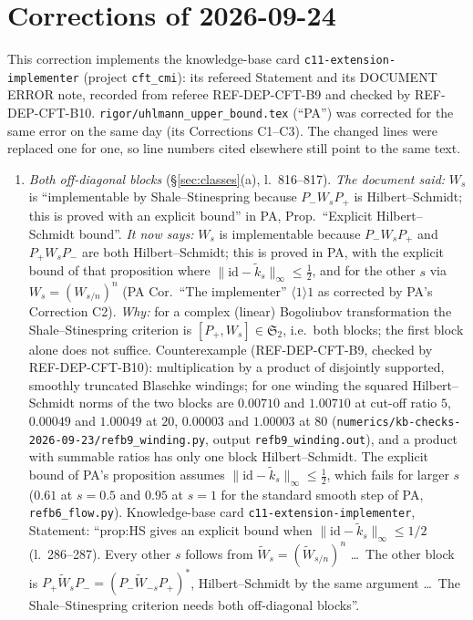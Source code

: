 \documentclass[11pt]{article}
\newcommand{\norm}[1]{\lVert #1\rVert}
\newcommand{\ktil}{\widetilde k}
\begin{document}
\section*{Corrections of 2026-09-24}
\sloppy
This correction implements the knowledge-base card \texttt{c11-extension-implementer} (project
\texttt{cft\_cmi}): its refereed Statement and its DOCUMENT ERROR note, recorded from referee
REF-DEP-CFT-B9 and checked by REF-DEP-CFT-B10.  \texttt{rigor/uhlmann\_upper\_bound.tex} (``PA'') was
corrected for the same error on the same day (its Corrections C1--C3).  The changed lines were
replaced one for one, so line numbers cited elsewhere still point to the same text.
\begin{enumerate}[leftmargin=1.8em,label=\textup{(C\arabic*)},ref=C\arabic*]
\item\label{corr0924:C1} \emph{Both off-diagonal blocks} (\S\ref{sec:classes}(a), l.~816--817).
 \emph{The document said:} $W_s$ is ``implementable by Shale--Stinespring because $P_-W_sP_+$ is
 Hilbert--Schmidt; this is proved with an explicit bound'' in PA, Prop.~``Explicit
 Hilbert--Schmidt bound''.
 \emph{It now says:} $W_s$ is implementable because $P_-W_sP_+$ and $P_+W_sP_-$ are both
 Hilbert--Schmidt; this is proved in PA, with the explicit bound of that proposition where
 $\norm{\mathrm{id}-\ktil_s}_\infty\le\frac12$, and for the other $s$ via $W_s=(W_{s/n})^n$
 (PA Cor.~``The implementer'' $\langle1\rangle1$ as corrected by PA's Correction C2).
 \emph{Why:} for a complex (linear) Bogoliubov transformation the Shale--Stinespring criterion is
 $[P_+,W_s]\in\mathfrak S_2$, i.e.\ both blocks; the first block alone does not suffice.  Counterexample
 (REF-DEP-CFT-B9, checked by REF-DEP-CFT-B10): multiplication by a product of disjointly supported,
 smoothly truncated Blaschke windings; for one winding the squared Hilbert--Schmidt norms of the two
 blocks are $0.00710$ and $1.00710$ at cut-off ratio $5$, $0.00049$ and $1.00049$ at $20$, $0.00003$
 and $1.00003$ at $80$ (\texttt{numerics/kb-checks-2026-09-23/refb9\_winding.py}, output
 \texttt{refb9\_winding.out}), and a product with summable ratios has only one block
 Hilbert--Schmidt.  The explicit bound of PA's proposition assumes
 $\norm{\mathrm{id}-\ktil_s}_\infty\le\frac12$, which fails for larger $s$ ($0.61$ at $s=0.5$ and
 $0.95$ at $s=1$ for the standard smooth step of PA, \texttt{refb6\_flow.py}).  Knowledge-base card
 \texttt{c11-extension-implementer}, Statement: ``prop:HS gives an explicit bound when
 $\norm{\mathrm{id}-\tilde k_s}_\infty\le1/2$ (l.~286--287).  Every other $s$ follows from
 $\tilde W_s=(\tilde W_{s/n})^n$ \dots\ The other block is $P_+\tilde W_sP_-=(P_-\tilde W_{-s}P_+)^*$,
 Hilbert--Schmidt by the same argument \dots\ The Shale--Stinespring criterion needs both
 off-diagonal blocks''.
\end{enumerate}
\end{document}
